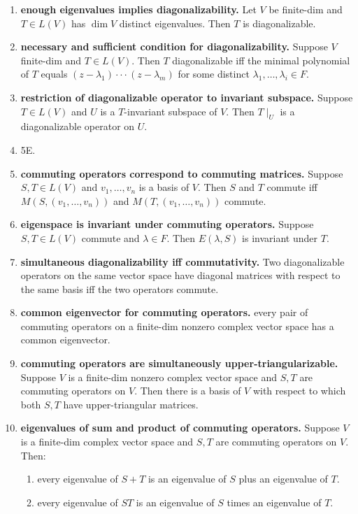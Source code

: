 \begin{enumerate}
	\item \textbf{enough eigenvalues implies diagonalizability. } Let $V$ be finite-dim and $T \in L(V)$ has $\dim V$ distinct eigenvalues. Then $T$ is diagonalizable. 
	\item \textbf{necessary and sufficient condition for diagonalizability. } Suppose $V$ finite-dim and $T \in L(V)$. Then $T$ diagonalizable iff the minimal polynomial of $T$ equals $(z-\lambda_1) \cdot \cdot \cdot (z-\lambda_m)$ for some distinct $\lambda_1,\dots,\lambda_i \in F$. 
	\item \textbf{restriction of diagonalizable operator to invariant subspace. } Suppose $T \in L(V)$ and $U$ is a $T$-invariant subspace of $V$. Then $T \mid_U$ is a diagonalizable operator on $U$. 
	\item 5E. 
	\item \textbf{commuting operators correspond to commuting matrices. } Suppose $S,T \in L(V)$ and $v_1,\dots,v_n$ is a basis of $V$. Then $S$ and $T$ commute iff $M(S,(v_1,\dots,v_n))$ and $M(T,(v_1,\dots,v_n))$ commute. 
	\item \textbf{eigenspace is invariant under commuting operators. } Suppose $S,T \in L(V)$ commute and $\lambda \in F$. Then $E(\lambda,S)$ is invariant under $T$. 
	\item \textbf{simultaneous diagonalizability iff commutativity. } Two diagonalizable operators on the same vector space have diagonal matrices with respect to the same basis iff the two operators commute. 
	\item \textbf{common eigenvector for commuting operators. } every pair of commuting operators on a finite-dim nonzero complex vector space has a common eigenvector. 
	\item \textbf{commuting operators are simultaneously upper-triangularizable. } Suppose $V$ is a finite-dim nonzero complex vector space and $S,T$ are commuting operators on $V$. Then there is a basis of $V$ with respect to which both $S,T$ have upper-triangular matrices. 
	\item \textbf{eigenvalues of sum and product of commuting operators. } Suppose $V$ is a finite-dim complex vector space and $S,T$ are commuting operators on $V$. Then: 
	\begin{enumerate}
		\item every eigenvalue of $S+T$ is an eigenvalue of $S$ plus an eigenvalue of $T$. 
		\item every eigenvalue of $ST$ is an eigenvalue of $S$ times an eigenvalue of $T$. 
	\end{enumerate}

\end{enumerate}
